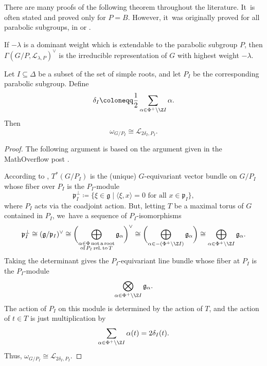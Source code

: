 There are many proofs of the following theorem throughout the literature. It~is often stated and proved only for $P=B$. However, it~was originally proved for all parabolic subgroups, \eg in \cite{Ser54} or \cite[Cor.\,to Th.\,V]{Bot57}.

\begin{thm}\label{th:borel-weil}
If $-\lambda$ is a dominant weight which is extendable to the parabolic subgroup $P$, then $\Gamma(G/P,\mathscr{L}_{\lambda, P})^\vee$ is the irreducible representation of $G$ with highest weight $-\lambda$.
\end{thm}

\begin{lem}\label{can-as-char}
Let $I\subseteq \Delta$ be a subset of the set of simple roots, and let $P_I$ be the corresponding parabolic subgroup. Define
\begin{equation*}
\delta_I \coloneqq \frac{1}{2}\sum_{\alpha\in \Phi^+\setminus \Z I} \alpha.
\end{equation*}
Then
\begin{equation*}
\omega_{G/P_I} \cong \mathscr{L}_{2\delta_I, P_I}.
\end{equation*}
\end{lem}

\begin{proof}
The following argument is based on the argument given in the MathOverflow post \cite{403574}.

According to \cite[Lem.\,1.4.9]{CG10}, $T^*(G/P_I)$ is the (unique) $G$-equivariant vector bundle on $G/P_I$ whose fiber over $P_I$ is the $P_I$\nobreakdash-mod\-ule
\[
\mathfrak{p}_I^\perp\coloneqq \{\xi \in \mathfrak{g} \mid \langle \xi, x\rangle = 0 \text{ for all }x\in \mathfrak{p}_I\},
\]
where $P_I$ acts via the coadjoint action.
But, letting $T$ be a maximal torus of $G$ contained in $P_I$, we~have a sequence of $P_I$-isomorphisms
\begin{align*}
\mathfrak{p}_I^\perp \cong (\mathfrak{g}/\mathfrak{p}_I)^\vee
\cong \biggl(\bigoplus_{\substack{\alpha\in \Phi\text{\,not\,a\,root}\\\text{of\,}P_I\text{\,rel.\,to\,}T}}\mathfrak{g}_\alpha\biggr)^\vee
\cong \biggl(\bigoplus_{\alpha\in -(\Phi^+\setminus \Z I)} \mathfrak{g}_\alpha\biggr)
\cong \bigoplus_{\alpha\in \Phi^+\setminus \Z I} \mathfrak{g}_\alpha.
\end{align*}
Taking the determinant gives the $P_I$-equivariant line bundle whose fiber at $P_I$ is the $P_I$\nobreakdash-mod\-ule
\begin{equation*}
\bigotimes_{\alpha\in \Phi^+\setminus \Z I} \mathfrak{g}_\alpha.
\end{equation*}
The action of $P_I$ on this module is determined by the action of $T$, and the action of $t\in T$ is just multiplication by
\[
\sum_{\alpha \in \Phi^+\setminus \Z I} \alpha(t) = 2\delta_I(t).
\]
Thus, $\omega_{G/P_I} \cong \mathscr{L}_{2\delta_I, P_I}$.
\end{proof}

